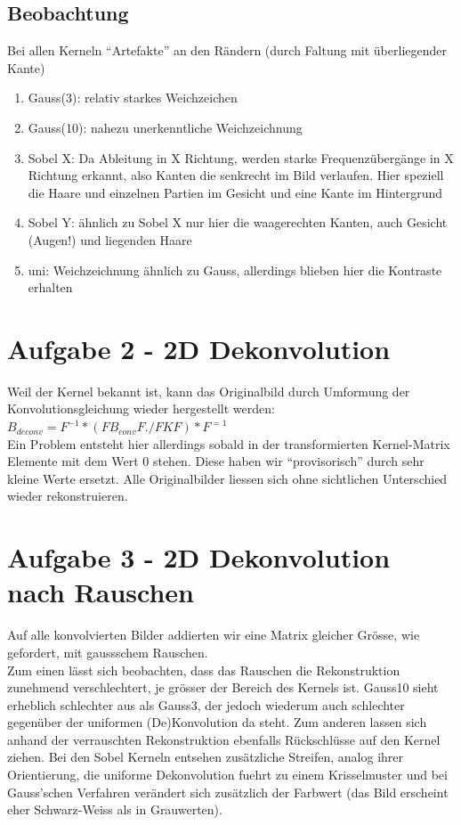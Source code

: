 \subsection*{Beobachtung}
Bei allen Kerneln ``Artefakte'' an den R\"andern (durch Faltung mit \"uberliegender Kante)
\begin{enumerate}
\item Gauss(3): relativ starkes Weichzeichen
\item Gauss(10): nahezu unerkenntliche Weichzeichnung
\item Sobel X: Da Ableitung in X Richtung, werden starke Frequenz\"uberg\"ange in X Richtung
erkannt, also Kanten die senkrecht im Bild verlaufen. Hier speziell die Haare und einzelnen 
Partien im Gesicht und eine Kante im Hintergrund
\item Sobel Y: \"ahnlich zu Sobel X nur hier die waagerechten Kanten, auch Gesicht (Augen!) und
liegenden Haare
\item uni: Weichzeichnung \"ahnlich zu Gauss, allerdings blieben hier die Kontraste erhalten
\end{enumerate}

\section*{Aufgabe 2 - 2D Dekonvolution}
Weil der Kernel bekannt ist, kann das Originalbild durch Umformung der Konvolutionsgleichung
wieder hergestellt werden: $B_{deconv}=F^{-1}*(FB_{conv}F ./ FKF)*F^{=1}$
\\
Ein Problem entsteht hier allerdings sobald in der transformierten Kernel-Matrix Elemente mit
dem Wert $0$ stehen. Diese haben wir ``provisorisch'' durch sehr kleine Werte ersetzt. 
Alle Originalbilder liessen sich ohne sichtlichen Unterschied wieder rekonstruieren.

\section*{Aufgabe 3 - 2D Dekonvolution nach Rauschen}
Auf alle konvolvierten Bilder addierten wir eine Matrix gleicher Gr\"osse, wie gefordert, mit
gaussschem Rauschen.
\\
Zum einen l\"asst sich beobachten, dass das Rauschen die Rekonstruktion zunehmend
verschlechtert, je gr\"osser der Bereich des Kernels ist. Gauss10 sieht erheblich schlechter
aus als Gauss3, der jedoch wiederum auch schlechter gegen\"uber der uniformen (De)Konvolution
da steht. Zum anderen lassen sich anhand der verrauschten Rekonstruktion ebenfalls R\"uckschl\"usse auf den Kernel ziehen. Bei den Sobel Kerneln entsehen zus\"atzliche Streifen, analog
ihrer Orientierung, die uniforme Dekonvolution fuehrt zu einem Krisselmuster und bei Gauss'schen Verfahren ver\"andert sich zus\"atzlich der Farbwert (das Bild erscheint eher Schwarz-Weiss als in Grauwerten).


